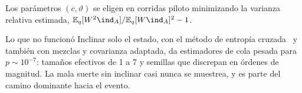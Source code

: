 Los parámetros $(c,\vartheta)$ se eligen en corridas piloto minimizando la varianza relativa estimada, $\E_q[W^2\ind_A]/\E_q[W\ind_A]^2-1$.

\begin{nota}{Lo que no funcionó}
Inclinar solo el estado, con el método de entropía cruzada~\cite{rubinstein2004} y también con mezclas y covarianza adaptada, da estimadores de cola pesada para $p\sim10^{-7}$: tamaños efectivos de 1 a 7 y semillas que discrepan en órdenes de magnitud. La mala suerte sin inclinar casi nunca se muestrea, y es parte del camino dominante hacia el evento.
\end{nota}
